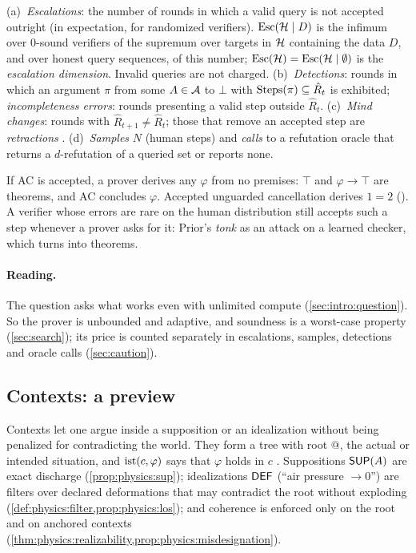 \begin{definition}[Cost]\label{def:setting:cost}
(a)~\emph{Escalations}: the number of rounds in which a valid query is not
accepted outright (in expectation, for randomized verifiers). $\mathrm{Esc}(\mathcal{H}\mid D)$ is
the infimum over $0$-sound verifiers of the supremum over targets in $\mathcal{H}$
containing the data $D$, and over honest query sequences, of this number;
$\mathrm{Esc}(\mathcal{H})=\mathrm{Esc}(\mathcal{H}\mid\emptyset)$ is the \emph{escalation dimension}. Invalid
queries are not charged.
(b)~\emph{Detections}: rounds in which an argument $\pi$ from some $A\in\mathcal{A}$ to
$\bot$ with $\mathrm{Steps}(\pi)\subseteq\hat R_t$ is exhibited; \emph{incompleteness
errors}: rounds presenting a valid step outside $\hat R_t$.
(c)~\emph{Mind changes}: rounds with $\hat R_{t+1}\neq\hat R_t$; those that remove
an accepted step are \emph{retractions} \citep{kelly1996logic}.
(d)~\emph{Samples} $N$ (human steps) and \emph{calls} to a refutation oracle that
returns a $d$-refutation of a queried set or reports none.
\end{definition}

\begin{example}\label{ex:setting:exploit}
If AC is accepted, a prover derives any $\varphi$ from no premises: $\top$ and
$\varphi\to\top$ are theorems, and AC concludes $\varphi$. Accepted unguarded
cancellation derives $1=2$ (). A verifier whose errors are
rare on the human distribution still accepts such a step whenever a prover asks
for it: Prior's \emph{tonk} \citep{prior1960runabout} as an attack on a learned
checker, which  turns into theorems.
\end{example}

\paragraph{Reading.} The question asks what works even with unlimited compute
(\cref{sec:intro:question}). So the prover is unbounded and adaptive, and soundness
is a worst-case property (\cref{sec:search}); its price is counted separately in
escalations, samples, detections and oracle calls (\cref{sec:caution}).

\subsection{Contexts: a preview}\label{sec:setting:contexts}

Contexts let one argue inside a supposition or an idealization without being
penalized for contradicting the world. They form a tree with root $@$, the
actual or intended situation, and $\mathrm{ist}(c,\varphi)$ says that $\varphi$ holds in
$c$ \citep{mccarthy1993notes}. Suppositions $\mathsf{SUP}(A)$ are exact
discharge (\cref{prop:physics:sup}); idealizations $\mathsf{DEF}$ (``air pressure
$\to0$'') are filters over declared deformations that may contradict the root
without exploding (\cref{def:physics:filter,prop:physics:los}); and coherence is
enforced only on the root and on anchored contexts
(\cref{thm:physics:realizability,prop:physics:misdesignation}).
